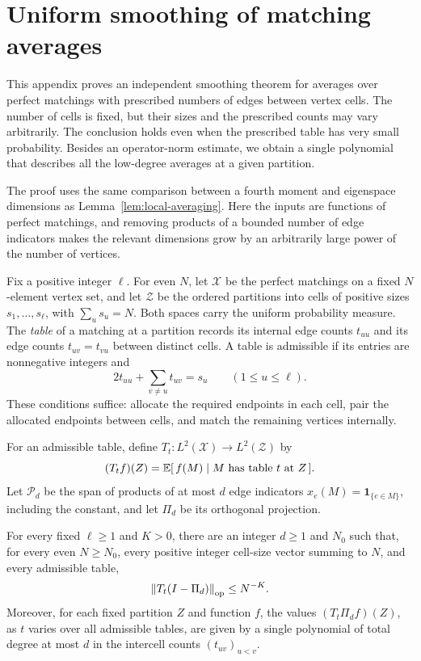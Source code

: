 \section{Uniform smoothing of matching averages}\label{sec:matching-smoothing}

This appendix proves an independent smoothing theorem for averages over
perfect matchings with prescribed numbers of edges between vertex cells.
The number of cells is fixed, but their sizes and the prescribed counts
may vary arbitrarily.  The conclusion holds even when the prescribed
table has very small probability.  Besides an operator-norm estimate,
we obtain a single polynomial that describes all the low-degree averages
at a given partition.

The proof uses the same comparison between a fourth moment and eigenspace
dimensions as Lemma~\ref{lem:local-averaging}.  Here the inputs are
functions of perfect matchings, and removing products of a bounded number
of edge indicators makes the relevant dimensions grow by an arbitrarily
large power of the number of vertices.

Fix a positive integer \(\ell\).  For even \(N\), let \(\mathcal X\)
be the perfect matchings on a fixed \(N\)-element vertex set, and let
\(\mathcal Z\) be the ordered partitions into cells of positive sizes
\(s_1,\ldots,s_\ell\), with \(\sum_us_u=N\).  Both spaces carry the
uniform probability measure.  The \emph{table} of a matching at a
partition records its internal edge counts \(t_{uu}\) and its edge
counts \(t_{uv}=t_{vu}\) between distinct cells.  A table is admissible
if its entries are nonnegative integers and
\begin{equation}\label{smooth:eq-table-degrees}
  2t_{uu}+\sum_{v\ne u}t_{uv}=s_u
  \qquad (1\le u\le\ell).
\end{equation}
These conditions suffice: allocate the required endpoints in each
cell, pair the allocated endpoints between cells, and match the
remaining vertices internally.

For an admissible table, define
\(T_t:L^2(\mathcal X)\longrightarrow L^2(\mathcal Z)\) by
\[
  (T_tf)(Z)=\mathbb E[\,f(M)\mid M\text{ has table }t\text{ at }Z\,].
\]
Let \(\mathcal P_d\) be the span of products of at most \(d\) edge
indicators \(x_e(M)=\mathbf1_{\{e\in M\}}\), including the constant,
and let \(\Pi_d\) be its orthogonal projection.

\begin{theorem}\label{thm:matching-smoothing}
For every fixed \(\ell\ge1\) and \(K>0\), there are an integer
\(d\ge1\) and \(N_0\) such that, for every even \(N\ge N_0\), every
positive integer cell-size vector summing to \(N\), and every admissible table,
\begin{equation}\label{smooth:eq-smoothing}
  \left\lVert T_t(I-\Pi_d)\right\rVert_{\mathrm{op}}\le N^{-K}.
\end{equation}
Moreover, for each fixed partition \(Z\) and function \(f\), the values
\((T_t\Pi_df)(Z)\), as \(t\) varies over all admissible tables, are
given by a single polynomial of total degree at most \(d\) in the
intercell counts \((t_{uv})_{u<v}\).
\end{theorem}

